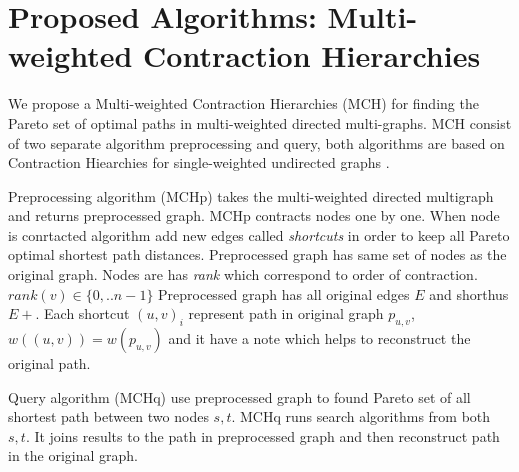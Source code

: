 
\section{Proposed Algorithms: Multi-weighted Contraction Hierarchies}

We propose a Multi-weighted Contraction Hierarchies (MCH) for finding the Pareto set
of optimal paths in multi-weighted directed multi-graphs. 
MCH consist of two separate algorithm preprocessing and query,
both algorithms are based on Contraction Hiearchies 
for single-weighted undirected graphs \cite{geisberger2008contraction}.


Preprocessing algorithm (MCHp) takes the multi-weighted directed multigraph
and returns preprocessed graph. MCHp contracts nodes one by one. 
When node is conrtacted algorithm add new edges called \emph{shortcuts} in order
to keep all Pareto optimal shortest path distances. 
Preprocessed graph has same set of nodes as the original graph.
Nodes are has \emph{rank} which correspond to order of contraction.
$rank(v) \in \{0,..n-1\}$
Preprocessed graph has all original edges $E$ and shorthus $E+$.
Each shortcut $(u,v)_i$ represent 
path in original graph $p_{u,v}$, $w((u,v)) = w(p_{u,v})$ and it have a note which helps
to reconstruct the original path.

Query algorithm (MCHq) use preprocessed graph to found Pareto set of all
shortest path between two nodes $s, t$. MCHq runs search algorithms
from both $s, t$. 
It joins results to the path in preprocessed graph 
and then reconstruct path in the original graph.




